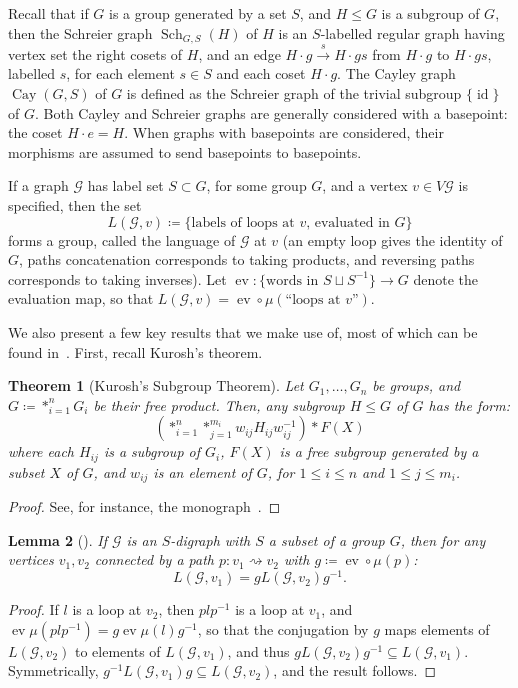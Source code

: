 \documentclass[10pt,a4paper]{amsart}
\newtheorem{theo}{Theorem}[section]
\newtheorem{lemm}[theo]{Lemma}
\theoremstyle{definition}
\newcommand{\cG}{\mathcal{G}}
\DeclareMathOperator{\Sch}{Sch}
\DeclareMathOperator{\Cay}{Cay}
\DeclareMathOperator{\ev}{ev}
\DeclareMathOperator{\id}{id}
\begin{document}
Recall that if $G$ is a group generated by a set $S$, and $H\leq G$ is a subgroup of $G$, then the Schreier graph $\Sch_{G,S}(H)$ of $H$ is an $S$-labelled regular graph having vertex set the right cosets of $H$, and an edge $H\cdot g \xrightarrow{s} H\cdot gs$ from $H\cdot g$ to $H\cdot gs$, labelled $s$, for each element $s\in S$ and each coset $H\cdot g$. The Cayley graph $\Cay(G, S)$ of $G$ is defined as the Schreier graph of the trivial subgroup $\{ \id \}$ of $G$. Both Cayley and Schreier graphs are generally considered with a basepoint: the coset $H\cdot e = H$. When graphs with basepoints are considered, their morphisms are assumed to send basepoints to basepoints.

If a graph $\mathcal{G}$ has label set $S \subset G$, for some group $G$, and a vertex $v \in V\cG$ is specified, then the set
\[
 L(\mathcal{G},v) \coloneqq \{\text{labels of loops at $v$, evaluated in $G$}\}
\]
forms a group, called the language of $\mathcal{G}$ at $v$ (an empty loop gives the identity of $G$, paths concatenation corresponds to taking products, and reversing paths corresponds to taking inverses). Let $\ev : \{\text{words in }S \sqcup S^{-1}\} \to G$ denote the evaluation map, so that $L(\mathcal{G},v) = \ev {\circ}{\mu}\left(\text{``loops at $v$''}\right)$. 

We also present a few key results that we make use of, most of which can be found in~\cite{KM, St, We}. First, recall Kurosh's theorem.

\begin{theo}[Kurosh's Subgroup Theorem]
 Let $G_{1}, \dots, G_n$ be groups, and $G \coloneqq *_{i=1}^n G_i$ be their free product.
 Then, any subgroup $H \leq G$ of $G$ has the form:
 \[
 (*_{i=1}^n*_{j=1}^{m_i} w_{ij}H_{ij}w_{ij}^{-1} )* F(X)
 \]
 where each $H_{ij}$ is a subgroup of $G_i$, $F(X)$ is a free subgroup generated by a subset $X$ of $G$, and $w_{ij}$ is an element of $G$, for $1\leq i\leq n$ and $1\leq j\leq m_i$.
\end{theo}
\begin{proof}
 See, for instance, the monograph~\cite[pp.~56--57]{Se}.
\end{proof}

\begin{lemm}[{\cite[Lemma~7.5]{KM}}]\label{lemma:basepoint-conjugate}
If $\mathcal{G}$ is an $S$-digraph with $S$ a subset of a group $G$, then for any vertices $v_{1},v_{2}$ connected by a path $p:v_{1} \rightsquigarrow v_{2}$ with $g\coloneqq \ev \circ {\mu}(p)$:
 \[
 L(\mathcal{G},v_{1}) = gL(\mathcal{G},v_{2})g^{-1}.
 \]
\end{lemm}
\begin{proof}
If $l$ is a loop at $v_{2}$, then $plp^{-1}$ is a loop at $v_{1}$, and $\ev{\mu}(plp^{-1}) = g\ev{\mu}(l)g^{-1}$, so that the conjugation by $g$ maps elements of $L(\cG,v_{2})$ to elements of $L(\cG,v_{1})$, and thus $gL(\cG,v_{2})g^{-1} \subseteq L(\cG,v_{1})$. Symmetrically, $g^{-1}L(\cG,v_{1})g \subseteq L(\cG,v_{2})$, and the result follows.
\end{proof}
\end{document}
